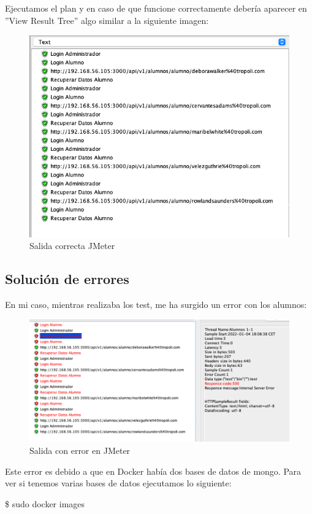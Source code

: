 Ejecutamos el plan y en caso de que funcione correctamente debería aparecer en ''View Result Tree'' algo similar a la siguiente imagen:
\begin{figure}[H]
    \centering  
    \includegraphics[scale=0.5]{images/jmeter_correcto.png}
    \caption{Salida correcta JMeter}
    \label{fig:jmeter_correcto}
\end{figure}

\subsection{Solución de errores}
En mi caso, mientras realizaba los test, me ha surgido un error con los alumnos:
\begin{figure}[H]
    \centering  
    \includegraphics[scale=0.5]{images/jmeter_error.png}
    \caption{Salida con error en JMeter}
    \label{fig:jmeter_error}
\end{figure}

Este error es  debido a que en Docker había dos bases de datos de mongo. Para ver si tenemos varias bases de datos ejecutamos lo siguiente:
\begin{tcolorbox}[colback=black!10, halign=left]
    \$ sudo docker images
\end{tcolorbox}

